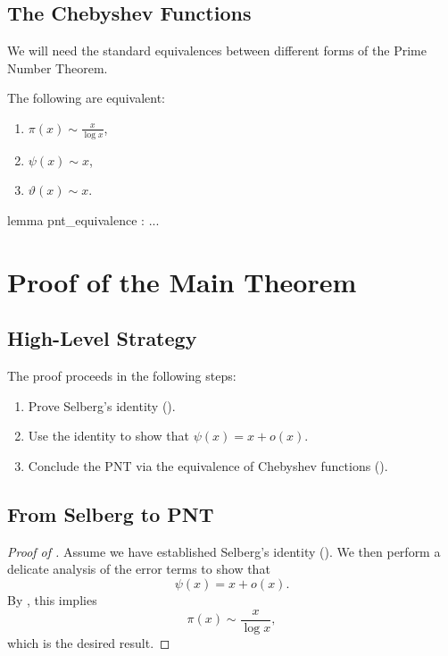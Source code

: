 \documentclass{report}
\begin{document}
\section{The Chebyshev Functions}

We will need the standard equivalences between different forms of the Prime Number Theorem.

\begin{lemma}\label{lem:pnt_equivalence}
  The following are equivalent:
  \begin{enumerate}
    \item $\pi(x) \sim \frac{x}{\log x}$,
    \item $\psi(x) \sim x$,
    \item $\vartheta(x) \sim x$.
  \end{enumerate}
\end{lemma}

\begin{leanok}
  lemma pnt_equivalence : ...
\end{leanok}

\chapter{Proof of the Main Theorem}

\section{High-Level Strategy}

The proof proceeds in the following steps:
\begin{enumerate}
  \item Prove Selberg's identity ().
  \item Use the identity to show that $\psi(x) = x + o(x)$.
  \item Conclude the PNT via the equivalence of Chebyshev functions ().
\end{enumerate}

\section{From Selberg to PNT}

\begin{proof}[Proof of ]
  Assume we have established Selberg's identity ().
  We then perform a delicate analysis of the error terms to show that
  \[
  \psi(x) = x + o(x).
  \]
  By , this implies
  \[
  \pi(x) \sim \frac{x}{\log x},
  \]
  which is the desired result.
\end{proof}
\end{document}

